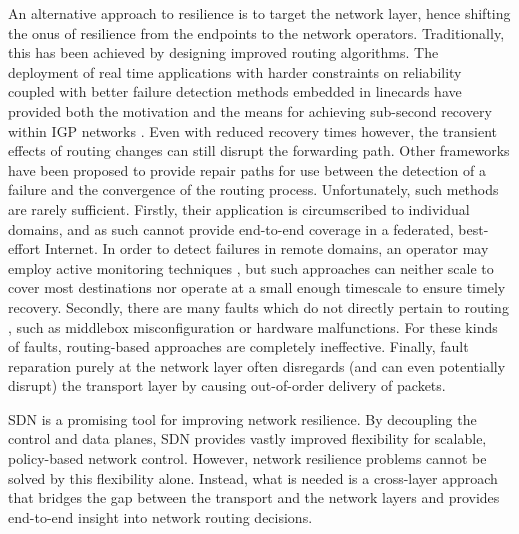 An alternative approach to resilience is to target the network layer, hence shifting the onus of resilience from the endpoints to the network operators.
Traditionally, this has been achieved by designing improved routing algorithms.
The deployment of real time applications with harder constraints on reliability coupled with better failure detection methods embedded in linecards have provided both the motivation and the means for achieving sub-second recovery within \ac{IGP} networks \cite{Francois:2005p514}.
Even with reduced recovery times however, the transient effects of routing changes can still disrupt the forwarding path. 
Other frameworks \cite{Bryant:2007p522,Torvi:2008p518,Lor:2010:PRE:1868447.1868449} have been proposed to provide repair paths for use between the detection of a failure and the convergence of the routing process.
Unfortunately, such methods are rarely sufficient.
Firstly, their application is circumscribed to individual domains, and as such cannot provide end-to-end coverage in a federated, best-effort Internet. 
In order to detect failures in remote domains, an operator may employ active monitoring techniques \cite{DBLP:conf/im/FokLMLLCC13}, but such approaches can neither scale to cover most destinations nor operate at a small enough timescale to ensure timely recovery.
Secondly, there are many faults which do not directly pertain to routing \cite{Turner:2010:CFL:2043164.1851220}, such as middlebox misconfiguration or hardware malfunctions.
For these kinds of faults, routing-based approaches are completely ineffective.
Finally, fault reparation purely at the network layer often disregards (and can even potentially disrupt) the transport layer by causing out-of-order delivery of packets.

\ac{SDN} \cite{McKeown:2008:OEI:1355734.1355746} is a promising tool for improving network resilience. By decoupling the control and data planes, \ac{SDN} provides vastly improved flexibility for scalable, policy-based network control. 
However, network resilience problems cannot be solved by this flexibility alone. 
Instead, what is needed is a cross-layer approach that bridges the gap between the transport and the network layers and provides end-to-end insight into network routing decisions.

